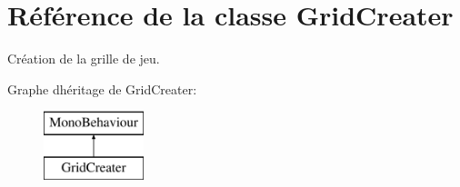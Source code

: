 \hypertarget{class_grid_creater}{}\section{Référence de la classe Grid\+Creater}
\label{class_grid_creater}


Création de la grille de jeu.  


Graphe d\textquotesingle{}héritage de Grid\+Creater\+:\begin{figure}[H]
\begin{center}
\leavevmode
\includegraphics[height=2.000000cm]{class_grid_creater}
\end{center}
\end{figure}
